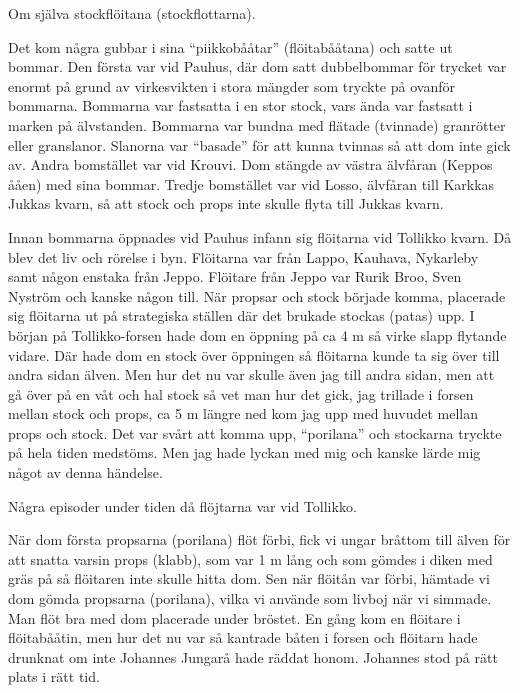 
Om själva stockflöitana (stockflottarna).

Det kom några gubbar i sina ``piikkobååtar'' (flöitabååtana) och satte ut bommar. Den första var vid Pauhus, där dom satt dubbelbommar för trycket var enormt på grund av virkesvikten i stora mängder som tryckte på ovanför bommarna. Bommarna var fastsatta i en stor stock, vars ända var fastsatt i marken på älvstanden. Bommarna var bundna med flätade (tvinnade) granrötter eller granslanor. Slanorna var ``basade'' för att kunna tvinnas så att dom inte gick av. Andra bomstället var vid Krouvi. Dom stängde av västra älvfåran (Keppos ååen) med sina bommar. Tredje bomstället var vid Losso, älvfåran till Karkkas Jukkas kvarn, så att stock och props inte skulle flyta till Jukkas kvarn.

Innan bommarna öppnades vid Pauhus infann sig flöitarna vid Tollikko kvarn. Då blev det liv och rörelse i byn. Flöitarna var från Lappo, Kauhava, Nykarleby samt någon enstaka från Jeppo. Flöitare från Jeppo var Rurik Broo, Sven Nyström och kanske någon till. När propsar och stock började komma, placerade sig flöitarna ut på strategiska ställen där det brukade stockas (patas) upp. I början på Tollikko-forsen hade dom en öppning på ca 4 m så virke slapp flytande vidare. Där hade dom en stock över öppningen så flöitarna kunde ta sig över till andra sidan älven. Men hur det nu var skulle även jag till andra sidan, men att gå över på en våt och hal stock så vet man hur det gick, jag trillade i forsen mellan stock och props, ca 5 m längre ned kom jag upp med huvudet mellan props och stock. Det var svårt att komma upp, ``porilana'' och stockarna tryckte på hela tiden medstöms. Men jag hade lyckan med mig och kanske lärde mig något av denna händelse.


Några episoder under tiden då flöjtarna var vid Tollikko.

När dom första propsarna (porilana) flöt förbi, fick vi ungar bråttom till älven för att snatta varsin props (klabb), som var 1 m lång och som gömdes i diken med gräs på så flöitaren inte skulle hitta dom. Sen när flöitån var förbi, hämtade vi dom gömda propsarna (porilana), vilka vi använde som livboj när vi simmade. Man flöt bra med dom placerade under bröstet. En gång kom en flöitare i flöitabååtin, men hur det nu var så kantrade båten i forsen och flöitarn hade drunknat om inte Johannes Jungarå hade räddat honom. Johannes stod på rätt plats i rätt tid.

